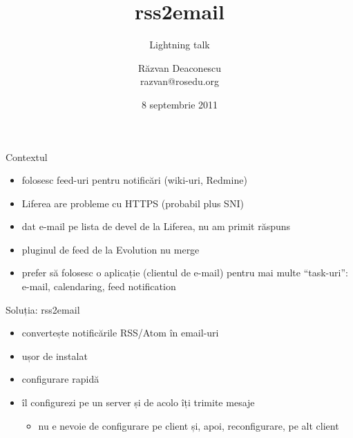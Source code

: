 \documentclass{simple}
\title[rss2email]{rss2email}
\subtitle{Lightning talk}
\institute{Întâlnirile lunare RLUG -- Septembrie 2011}
\author[Răzvan Deaconescu]{Răzvan Deaconescu\\
      razvan@rosedu.org}
\date{8 septembrie 2011}
\begin{document}
\frame{\titlepage}

\begin{frame}{Contextul}
  \begin{itemize}     %
    \item folosesc feed-uri pentru notificări (wiki-uri, Redmine)
    \item Liferea are probleme cu HTTPS (probabil plus SNI)
    \item dat e-mail pe lista de devel de la Liferea, nu am primit răspuns
    \item pluginul de feed de la Evolution nu merge
    \item prefer să folosesc o aplicație (clientul de e-mail) pentru mai multe
    ``task-uri'': e-mail, calendaring, feed notification
  \end{itemize}
\end{frame}

\begin{frame}{Soluția: rss2email}
  \begin{itemize}
    \item convertește notificările RSS/Atom în email-uri
    \item ușor de instalat
    \item configurare rapidă
    \item îl configurezi pe un server și de acolo îți trimite mesaje
      \begin{itemize}
        \item nu e nevoie de configurare pe client și, apoi, reconfigurare, pe
        alt client
      \end{itemize}
  \end{itemize}
\end{frame}
\end{document}
